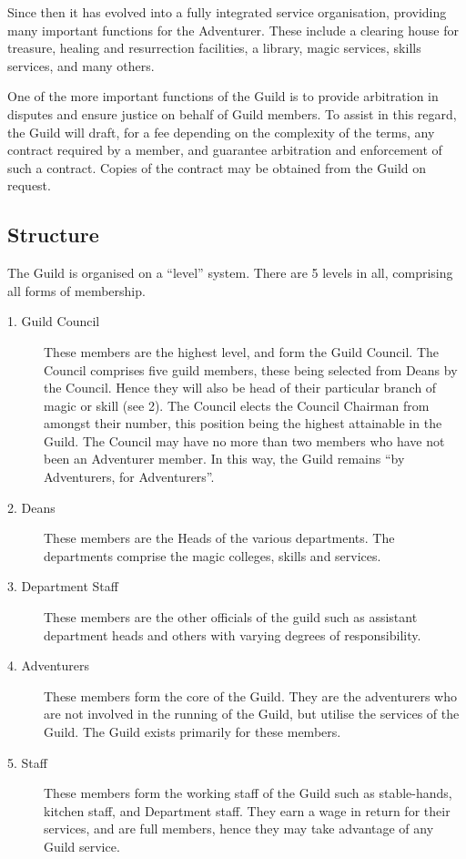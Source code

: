 \documentclass[twoside,a4paper]{article}
\begin{document}
\begin{multicols}{2}
Since then it has evolved into a fully integrated service
organisation, providing many important functions for the Adventurer.
These include a clearing house for treasure, healing and resurrection
facilities, a library, magic services, skills services, and many
others.

One of the more important functions of the Guild is to provide
arbitration in disputes and ensure justice on behalf of Guild
members. To assist in this regard, the Guild will draft, for a fee
depending on the complexity of the terms, any contract required by a
member, and guarantee arbitration and enforcement of such a
contract. Copies of the contract may be obtained from the Guild on
request.

\subsection{Structure}

The Guild is organised on a ``level'' system.  There are 5 levels in
all, comprising all forms of membership.

\begin{description}
\item[1. Guild Council] These members are the highest level, and form
the Guild Council. The Council comprises five guild members, these
being selected from Deans by the Council. Hence they will also be head
of their particular branch of magic or skill (see 2). The Council
elects the Council Chairman from amongst their number, this position
being the highest attainable in the Guild. The Council may have no
more than two members who have not been an Adventurer member. In this
way, the Guild remains ``by Adventurers, for Adventurers''.

\item[2. Deans] These members are the Heads of the various
departments.  The departments comprise the magic colleges, skills and
services.

\item[3. Department Staff] These members are the other officials of
the guild such as assistant department heads and others with varying
degrees of responsibility.

\item[4. Adventurers] These members form the core of the Guild. They
are the adventurers who are not involved in the running of the Guild,
but utilise the services of the Guild. The Guild exists primarily for
these members.

\item[5. Staff] These members form the working staff of the Guild such
as stable-hands, kitchen staff, and Department staff. They earn a wage
in return for their services, and are full members, hence they may
take advantage of any Guild service.


\end{description}
\end{multicols}
\end{document}
